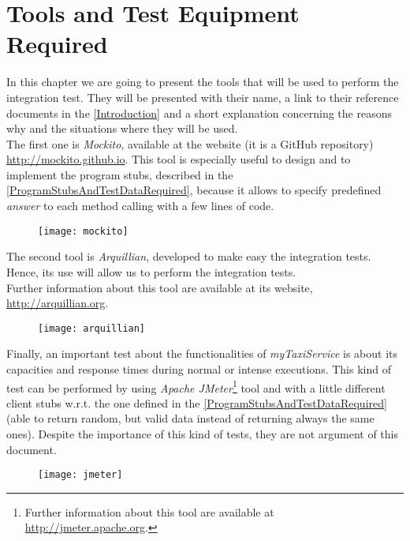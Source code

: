 \documentclass[\mainpath/main]{subfiles}
\begin{document}
\chapter{Tools and Test Equipment Required} %
\label{ToolsAndTestEquipmentRequired}

\setmyfancystyle

In this chapter we are going to present the tools that will be used to perform the integration test. They will be presented with their name, a link to their reference documents in the \autoref{Introduction} and a short explanation concerning the reasons why and the situations where they will be used.\\
The first one is \textit{Mockito}, available at the website (it is a GitHub repository) \url{http://mockito.github.io}. This tool is especially useful to design and to implement the program stubs, described in the \autoref{ProgramStubsAndTestDataRequired}, because it allows to specify predefined \textit{answer} to each method calling with a few lines of code.

\begin{figure}[!ht]
	\centering
	\texttt{[image: mockito]}
\end{figure}

The second tool is \textit{Arquillian}, developed to make easy the integration tests. Hence, its use will allow us to perform the integration tests.\\
Further information about this tool are available at its website, \url{http://arquillian.org}.

\begin{figure}[!ht]
	\centering
	\texttt{[image: arquillian]}
\end{figure}

Finally, an important test about the functionalities of \textit{myTaxiService} is about its capacities and response times during normal or intense executions. This kind of test can be performed by using \textit{Apache JMeter}\footnote{Further information about this tool are available at \url{http://jmeter.apache.org}.} tool and with a little different client stubs w.r.t. the one defined in the \autoref{ProgramStubsAndTestDataRequired} (able to return random, but valid data instead of returning always the same ones). Despite the importance of this kind of tests, they are not argument of this document.

\begin{figure}[!ht]
	\centering
	\texttt{[image: jmeter]}
\end{figure}
\end{document}
